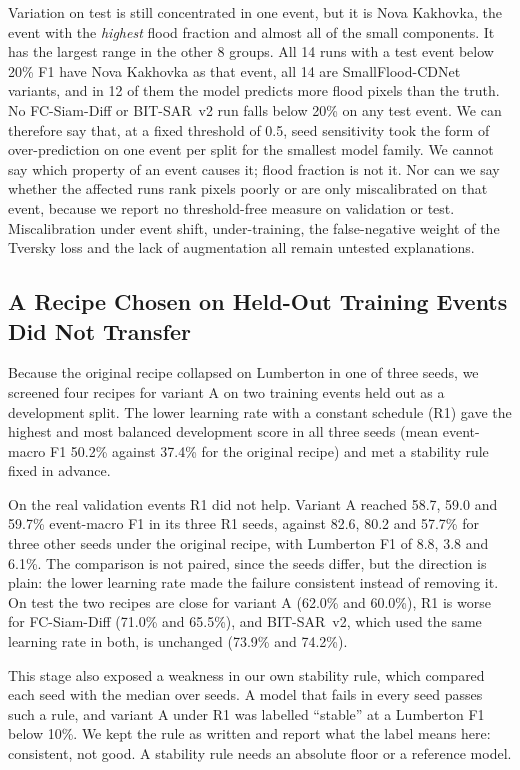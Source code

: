 \documentclass[runningheads]{llncs}
\begin{document}
Variation on test is still concentrated in one event, but it is Nova Kakhovka, the event with
the \emph{highest} flood fraction and almost all of the small components. It has the largest
range in the other 8 groups. All 14 runs with a test event below 20\% F1 have Nova Kakhovka
as that event, all 14 are SmallFlood-CDNet variants, and in 12 of them the model predicts more
flood pixels than the truth. No FC-Siam-Diff or BIT-SAR~v2 run falls below 20\% on any test
event. We can therefore say that, at a fixed threshold of 0.5, seed sensitivity took the form of
over-prediction on one event per split for the smallest model family. We cannot say which
property of an event causes it; flood fraction is not it. Nor can we say whether the
affected runs rank pixels poorly or are only miscalibrated on that event, because we report
no threshold-free measure on validation or test. Miscalibration under event shift,
under-training, the false-negative weight of the Tversky loss and the lack of augmentation
all remain untested explanations.

\subsection{A Recipe Chosen on Held-Out Training Events Did Not Transfer}
\label{sec:recipe}

Because the original recipe collapsed on Lumberton in one of three seeds, we screened four
recipes for variant A on two training events held out as a development split. The lower
learning rate with a constant schedule (R1) gave the highest and most balanced development
score in all three seeds (mean event-macro F1 50.2\% against 37.4\% for the original recipe)
and met a stability rule fixed in advance.

On the real validation events R1 did not help. Variant A reached 58.7, 59.0 and 59.7\%
event-macro F1 in its three R1 seeds, against 82.6, 80.2 and 57.7\% for three other seeds
under the original recipe, with Lumberton F1 of 8.8, 3.8 and 6.1\%. The comparison is not
paired, since the seeds differ, but the direction is plain: the lower learning rate made the
failure consistent instead of removing it. On test the two recipes are close for variant A
(62.0\% and 60.0\%), R1 is worse for FC-Siam-Diff (71.0\% and 65.5\%), and BIT-SAR~v2, which
used the same learning rate in both, is unchanged (73.9\% and 74.2\%).

This stage also exposed a weakness in our own stability rule, which compared each seed with
the median over seeds. A model that fails in every seed passes such a rule, and variant A
under R1 was labelled ``stable'' at a Lumberton F1 below 10\%. We kept the rule as written
and report what the label means here: consistent, not good. A stability rule needs an
absolute floor or a reference model.
\end{document}
